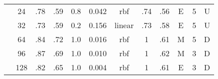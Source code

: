 \begin{table}
\begin{tabular}{|c|c|ccccc||ccccc|}
  &  24 &   .78 &  .59 & 0.8 &    0.042 &     rbf &   .74 &  .56 &      E & 5 &       U \\
  &  32 &   .73 &  .59 & 0.2 &    0.156 &  linear &   .73 &  .58 &      E & 5 &       U \\
  &  64 &   .84 &  .72 & 1.0 &    0.016 &     rbf &     1 &  .61 &      M & 5 &       D \\
  &  96 &   .87 &  .69 & 1.0 &    0.010 &     rbf &     1 &  .62 &      M & 3 &       D \\
  & 128 &   .82 &  .65 & 1.0 &    0.004 &     rbf &     1 &  .61 &      E & 3 &       D \\\hline
\end{tabular}
\end{table}
